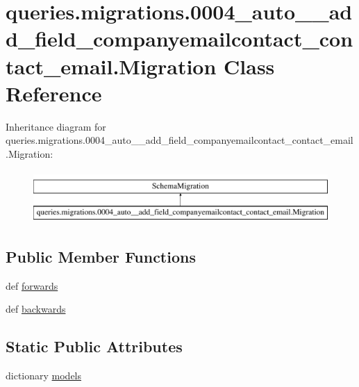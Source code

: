 \hypertarget{classqueries_1_1migrations_1_10004__auto____add__field__companyemailcontact__contact__email_1_1_migration}{\section{queries.\-migrations.0004\-\_\-auto\-\_\-\-\_\-add\-\_\-field\-\_\-companyemailcontact\-\_\-contact\-\_\-email.Migration Class Reference}
\label{classqueries_1_1migrations_1_10004__auto____add__field__companyemailcontact__contact__email_1_1_migration}
}
Inheritance diagram for queries.\-migrations.0004\-\_\-auto\-\_\-\-\_\-add\-\_\-field\-\_\-companyemailcontact\-\_\-contact\-\_\-email.Migration\-:\begin{figure}[H]
\begin{center}
\leavevmode
\includegraphics[height=2.000000cm]{classqueries_1_1migrations_1_10004__auto____add__field__companyemailcontact__contact__email_1_1_migration}
\end{center}
\end{figure}
\subsection*{Public Member Functions}
\begin{DoxyCompactItemize}
\item 
def \hyperlink{classqueries_1_1migrations_1_10004__auto____add__field__companyemailcontact__contact__email_1_1_migration_add876b7bb7130b48a6354f67b4d9e460}{forwards}
\item 
def \hyperlink{classqueries_1_1migrations_1_10004__auto____add__field__companyemailcontact__contact__email_1_1_migration_a710ea296909ee2260da5475ceb1132a0}{backwards}
\end{DoxyCompactItemize}
\subsection*{Static Public Attributes}
\begin{DoxyCompactItemize}
\item 
dictionary \hyperlink{classqueries_1_1migrations_1_10004__auto____add__field__companyemailcontact__contact__email_1_1_migration_a799bc75f91e4247a813a0826e4cef5c7}{models}
\end{DoxyCompactItemize}



